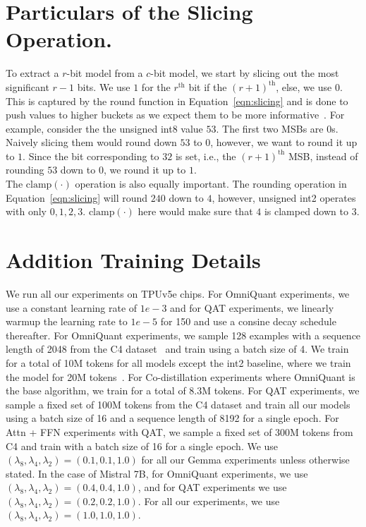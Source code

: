 \section{Particulars of the Slicing Operation.}
\label{app:slicing}
To extract a $r$-bit model from a $c$-bit model, we start by slicing out the most significant $r-1$ bits. We use $1$ for the $r^{\text{th}}$ bit if the $(r+1)^{\text{th}}$, else, we use $0$. This is captured by the round function in Equation~\ref{eqn:slicing} and is done to push values to higher buckets as we expect them to be more informative~\citep{wanda}. For example, consider the the unsigned int8 value $53$. The first two MSBs are $0$s. Naively slicing them would round down $53$ to $0$, however, we want to round it up to $1$. Since the bit corresponding to $32$ is set, i.e., the $(r+1)^{\text{th}}$ MSB, instead of rounding $53$ down to $0$, we round it up to $1$. \\
The $\text{clamp}(\cdot)$ operation is also equally important. The rounding operation in Equation~\ref{eqn:slicing} will round $240$ down to $4$, however, unsigned int2 operates with only $0, 1, 2, 3$. $\text{clamp}(\cdot)$ here would make sure that $4$ is clamped down to $3$.

\section{Addition Training Details}
\label{app:td}
We run all our experiments on TPUv5e chips. For OmniQuant experiments, we use a constant learning rate of $1e-3$ and for QAT experiments, we linearly warmup the learning rate to $1e-5$ for 150 and use a consine decay schedule thereafter. For OmniQuant experiments, we sample 128 examples with a sequence length of 2048 from the C4 dataset~\citep{raffel2020exploring} and train using a batch size of 4. We train for a total of 10M tokens for all models except the int2 baseline, where we train the model for 20M tokens~\citep{shao2023omniquant}. For Co-distillation experiments where OmniQuant is the base algorithm, we train for a total of 8.3M tokens. For QAT experiments, we sample a fixed set of 100M tokens from the C4 dataset and train all our models using a batch size of 16 and a sequence length of 8192 for a single epoch. For Attn + FFN experiments with QAT, we sample a fixed set of 300M tokens from C4 and train with a batch size of 16 for a single epoch.
We use $(\lambda_8, \lambda_4, \lambda_2) = (0.1, 0.1, 1.0)$ for all our Gemma experiments unless otherwise stated. In the case of Mistral 7B,  for OmniQuant experiments, we use $(\lambda_8, \lambda_4, \lambda_2) = (0.4, 0.4, 1.0)$, and for QAT experiments we use $(\lambda_8, \lambda_4, \lambda_2) = (0.2, 0.2, 1.0)$. For all our \epalg experiments, we use $(\lambda_8, \lambda_4, \lambda_2) = (1.0, 1.0, 1.0)$.

